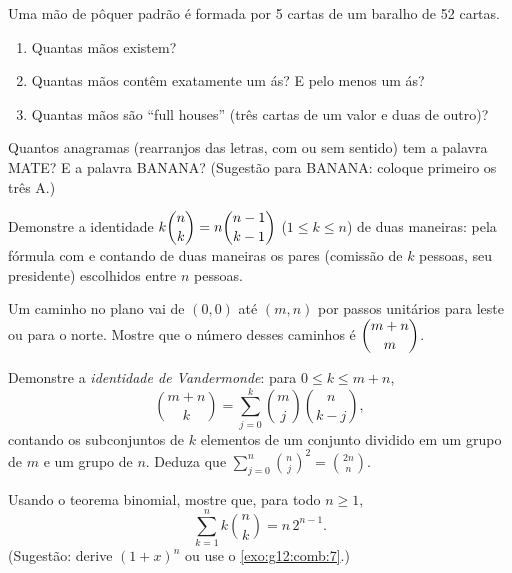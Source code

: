 \begin{exercise}[$\star\star$]\label{exo:g12:comb:5}
Uma mão de pôquer padrão é formada por 5 cartas de um baralho de 52 cartas.
\begin{enumerate}
  \item Quantas mãos existem?
  \item Quantas mãos contêm exatamente um ás? E pelo menos um ás?
  \item Quantas mãos são ``full houses'' (três cartas de um valor e duas de
        outro)?
\end{enumerate}
\end{exercise}

\begin{exercise}[$\star\star$]\label{exo:g12:comb:6}
Quantos anagramas (rearranjos das letras, com ou sem sentido) tem a palavra
MATE? E a palavra BANANA? (Sugestão para BANANA: coloque primeiro os três
A.)
\end{exercise}

\begin{exercise}[$\star\star$]\label{exo:g12:comb:7}
Demonstre a identidade $k\dbinom{n}{k} = n\dbinom{n-1}{k-1}$
($1 \leq k \leq n$) de duas maneiras: pela fórmula com  e contando
de duas maneiras os pares (comissão de $k$ pessoas, seu presidente)
escolhidos entre $n$ pessoas.
\end{exercise}

\begin{exercise}[$\star\star$]\label{exo:g12:comb:8}
Um caminho no plano vai de $(0,0)$ até $(m, n)$ por passos unitários para
leste ou para o norte. Mostre que o número desses caminhos é
$\dbinom{m+n}{m}$.
\end{exercise}

\begin{exercise}[$\star\star\star$]\label{exo:g12:comb:9}
Demonstre a \emph{identidade de Vandermonde}: para $0 \leq k \leq m + n$,
\[
\binom{m+n}{k} = \sum_{j=0}^{k} \binom{m}{j}\binom{n}{k-j},
\]
contando os subconjuntos de $k$ elementos de um conjunto dividido em um
grupo de $m$ e um grupo de $n$. Deduza que
$\displaystyle\sum_{j=0}^{n}\binom{n}{j}^{\!2} = \binom{2n}{n}$.
\end{exercise}

\begin{exercise}[$\star\star\star$]\label{exo:g12:comb:10}
Usando o teorema binomial, mostre que, para todo $n \geq 1$,
\[
\sum_{k=1}^{n} k \binom{n}{k} = n\,2^{n-1}.
\]
(Sugestão: derive $(1+x)^n$ ou use o \cref{exo:g12:comb:7}.)
\end{exercise}


